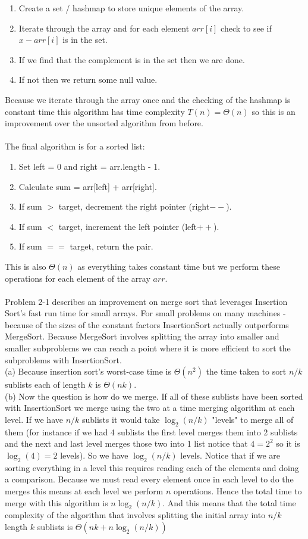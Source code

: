 \documentclass{scrartcl}
\theoremstyle{definition}
\theoremstyle{definition}
\theoremstyle{remark}
\numberwithin{equation}{section}
\begin{document}
\begin{enumerate}
    \item Create a set / hashmap to store unique elements of the array.
    \item Iterate through the array and for each element $arr[i]$ check to see if $x - arr[i]$ is in the set.
    \item If we find that the complement is in the set then we are done.
    \item If not then we return some null value.
\end{enumerate}

Because we iterate through the array once and the checking of the hashmap is constant time this algorithm has time complexity $T(n)=\Theta(n)$ so this is an improvement over the unsorted algorithm from before.\\
\\
The final algorithm is for a sorted list:
\begin{enumerate}
    \item Set left = 0 and right = arr.length - 1.
    \item Calculate sum = arr[left] + arr[right].
    \item If sum $>$ target, decrement the right pointer (right$--$).
    \item If sum $<$ target, increment the left pointer (left$++$).
    \item If sum $==$ target, return the pair.
\end{enumerate}
This is also $\Theta(n)$ as everything takes constant time but we perform these operations for each element of the array $arr$. \\
\\
Problem 2-1 describes an improvement on merge sort that leverages Insertion Sort's fast run time for small arrays. For small problems on many machines - because of the sizes of the constant factors InsertionSort actually outperforms MergeSort. Because MergeSort involves splitting the array into smaller and smaller subproblems we can reach a point where it is more efficient to sort the subproblems with InsertionSort. \\
(a) Because insertion sort's worst-case time is $\Theta(n^2)$ the time taken to sort $n/k$ sublists each of length $k$ is $\Theta(nk)$.\\
(b) Now the question is how do we merge. If all of these sublists have been sorted with InsertionSort we merge using the two at a time merging algorithm at each level. If we have $n/k$ sublists it would take $\log_2(n/k)$ "levels" to merge all of them (for instance if we had 4 sublists the first level merges them into 2 sublists and the next and last level merges those two into 1 list notice that $4=2^2$ so it is $\log_2(4)=2$ levels). So we have $\log_2(n/k)$ levels. Notice that if we are sorting everything in a level this requires reading each of the elements and doing a comparison. Because we must read every element once in each level to do the merges this means at each level we perform $n$ operations. Hence the total time to merge with this algorithm is $n\log_2(n/k)$. And this means that the total time complexity of the algorithm that involves splitting the initial array into $n/k$ length $k$ sublists is $\Theta(nk + n\log_2(n/k))$
\end{document}
